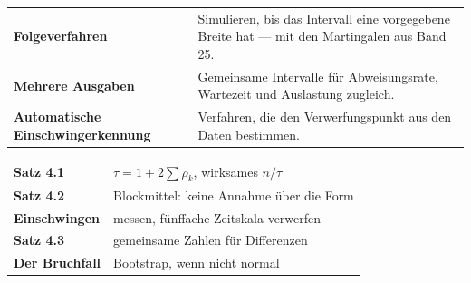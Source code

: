 \begin{forschung}
\begin{center}
{\small
\renewcommand{\arraystretch}{1.45}
\begin{tabular}{@{}P{3.0cm}P{5.2cm}@{}}
\toprule
\textbf{Folgeverfahren} & Simulieren, bis das Intervall eine vorgegebene Breite hat --- mit den Martingalen aus Band 25.\\
\textbf{Mehrere Ausgaben} & Gemeinsame Intervalle für Abweisungsrate, Wartezeit und Auslastung zugleich.\\
\textbf{Automatische Einschwingerkennung} & Verfahren, die den Verwerfungspunkt aus den Daten bestimmen.\\
\bottomrule
\end{tabular}}
\end{center}

\begin{center}
\begin{minipage}{0.88\textwidth}
\end{minipage}
\end{center}
\end{forschung}

\begin{merksatz}
\begin{center}
\renewcommand{\arraystretch}{1.5}
\begin{tabular}{@{}P{3.0cm}P{5.6cm}@{}}
\toprule
\textbf{Satz 4.1} & $\tau = 1+2\sum\rho_k$, wirksames $n/\tau$\\
\textbf{Satz 4.2} & Blockmittel: keine Annahme über die Form\\
\textbf{Einschwingen} & messen, fünffache Zeitskala verwerfen\\
\textbf{Satz 4.3} & gemeinsame Zahlen für Differenzen\\
\textbf{Der Bruchfall} & Bootstrap, wenn nicht normal\\
\bottomrule
\end{tabular}
\end{center}

\begin{center}
\begin{minipage}{0.88\textwidth}
\end{minipage}
\end{center}
\end{merksatz}
